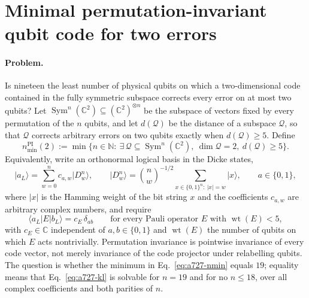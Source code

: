 \section{Minimal permutation-invariant qubit code for two errors}
\label{sec:op_a72722e455d85d55}

\paragraph{Problem.}
Is nineteen the least number of physical qubits on which a two-dimensional code
contained in the fully symmetric subspace corrects every error on at most two
qubits?  Let $\operatorname{Sym}^n(\mathbb C^2)\subseteq(\mathbb C^2)^{\otimes n}$
be the subspace of vectors fixed by every permutation of the $n$ qubits, and let
$d(\mathcal Q)$ be the distance of a subspace $\mathcal Q$, so that
$\mathcal Q$ corrects arbitrary errors on two qubits exactly when
$d(\mathcal Q)\geq5$.  Define
\begin{equation}
  n_{\min}^{\mathrm{PI}}(2):=\min\bigl\{n\in\mathbb N:\
    \exists\,\mathcal Q\subseteq\operatorname{Sym}^n(\mathbb C^2),\
    \dim\mathcal Q=2,\ d(\mathcal Q)\geq5\bigr\}.
  \label{eq:a727-nmin}
\end{equation}
Equivalently, write an orthonormal logical basis in the Dicke states,
\begin{equation}
  \lvert a_L\rangle=\sum_{w=0}^{n}c_{a,w}\lvert D_w^n\rangle,
  \qquad
  \lvert D_w^n\rangle=\binom nw^{-1/2}
    \sum_{x\in\{0,1\}^n:\ \lvert x\rvert=w}\lvert x\rangle,
  \qquad a\in\{0,1\},
  \label{eq:a727-dicke}
\end{equation}
where $\lvert x\rvert$ is the Hamming weight of the bit string $x$ and the
coefficients $c_{a,w}$ are arbitrary complex numbers, and require
\begin{equation}
  \langle a_L\rvert E\lvert b_L\rangle=c_E\,\delta_{ab}
  \qquad\text{for every Pauli operator } E \text{ with } \operatorname{wt}(E)<5,
  \label{eq:a727-kl}
\end{equation}
with $c_E\in\mathbb C$ independent of $a,b\in\{0,1\}$ and $\operatorname{wt}(E)$
the number of qubits on which $E$ acts nontrivially.  Permutation invariance is
pointwise invariance of every code vector, not merely invariance of the code
projector under relabelling qubits.  The question is whether the minimum in
Eq.~\eqref{eq:a727-nmin} equals $19$; equality means that
Eq.~\eqref{eq:a727-kl} is solvable for $n=19$ and for no $n\leq18$, over all
complex coefficients and both parities of $n$.

